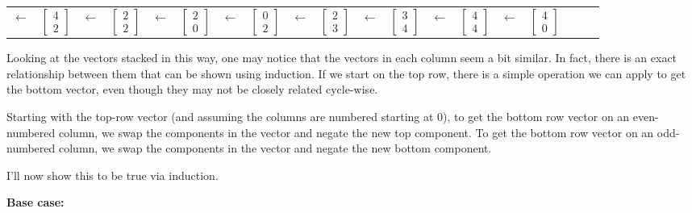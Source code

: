 \documentclass[a4paper, 12pt, reqno]{amsart}
\begin{document}
\begin{tabular}{*{19}{c}}
				$\leftarrow$ &
				$\begin{bmatrix}
					4 \\
					2
				\end{bmatrix}$ &
				$\leftarrow$ &
				$\begin{bmatrix}
					2 \\
					2
				\end{bmatrix}$ &
				$\leftarrow$ &
				$\begin{bmatrix}
					2 \\
					0
				\end{bmatrix}$ &
				$\leftarrow$ &
				$\begin{bmatrix}
					0 \\
					2
				\end{bmatrix}$ &
				$\leftarrow$ &
				$\begin{bmatrix}
					2 \\
					3
				\end{bmatrix}$ &
				$\leftarrow$ &
				$\begin{bmatrix}
					3 \\
					4
				\end{bmatrix}$ &
				$\leftarrow$ &
				$\begin{bmatrix}
					4 \\
					4
				\end{bmatrix}$ &
				$\leftarrow$ &
				$\begin{bmatrix}
					4 \\
					0
				\end{bmatrix}$
			\end{tabular}
			
			Looking at the vectors stacked in this way, one may notice that the vectors in each column seem a
			bit similar. In fact, there is an exact relationship between them that can be shown using induction.
			If we start on the top row, there is a simple operation we can apply to get the bottom vector, even
			though they may not be closely related cycle-wise. 
			
			Starting with the top-row vector (and assuming the columns are numbered starting at 0), to get the
			bottom row vector on an even-numbered column, we swap the components in the vector and negate the new
			top component. To get the bottom row vector on an odd-numbered column, we swap the components in the vector
			and negate the new bottom component.
			
			I'll now show this to be true via induction.
			
			\textbf{Base case:}
			
\end{document}
